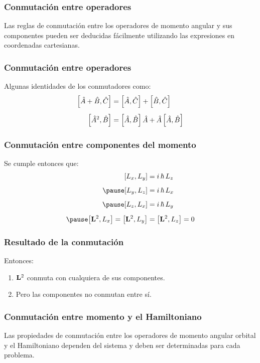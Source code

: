 \documentclass[12pt]{beamer}
\begin{document}
\begin{frame}
\frametitle{Conmutación entre operadores}
Las reglas de conmutación entre los operadores de momento angular y sus componentes pueden ser deducidas fácilmente utilizando las expresiones en coordenadas cartesianas.
\end{frame}
\begin{frame}
\frametitle{Conmutación entre operadores}
Algunas identidades de los conmutadores como:
\pause
\begin{eqnarray*}
\begin{aligned}
\comm{\hat{A} + \hat{B}}{\hat{C}} &= \comm{\hat{A}}{\hat{C}} + \comm{\hat{B}}{\hat{C}} \\[0.5em]
\comm{\hat{A}^{2}}{\hat{B}} &= \comm{\hat{A}}{\hat{B}} \, \hat{A} + \hat{A} \, \comm{\hat{A}}{\hat{B}}
\end{aligned}
\end{eqnarray*}
\end{frame}
\begin{frame}
\frametitle{Conmutación entre componentes del momento}
Se cumple entonces que:
\pause
\begin{eqnarray}
\begin{aligned}
\comm{L_{x}}{L_{y}} &= i \, \hbar \, L_{z} \\[0.5em] \pause
\comm{L_{y}}{L_{z}} &= i \, \hbar \, L_{x} \\[0.5em] \pause
\comm{L_{z}}{L_{x}} &= i \, \hbar \, L_{y} \\[0.5em] \pause
\comm{\vb{L}^{2}}{L_{x}} = \comm{\vb{L}^{2}}{L_{y}} &= \comm{\vb{L}^{2}}{L_{z}} = 0
\end{aligned}
\label{eq:ecuacion_01_07}
\end{eqnarray}
\end{frame}
\begin{frame}
\frametitle{Resultado de la conmutación}
Entonces: \pause
{}
\begin{enumerate}[<+->]
\item $\vb{L}^{2}$ conmuta con cualquiera de sus componentes.
\item Pero las componentes no conmutan entre sí.
\end{enumerate}
\end{frame}
\begin{frame}
\frametitle{Conmutación entre momento y el Hamiltoniano}
Las propiedades de conmutación entre los operadores de momento angular orbital y el Hamiltoniano dependen del sistema y deben ser determinadas para cada problema.
\end{frame}
\end{document}
